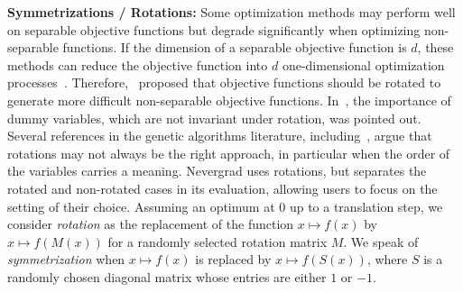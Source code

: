 {\textbf{Symmetrizations / Rotations:}} Some optimization methods may perform well on separable objective functions but degrade significantly when optimizing non-separable functions. If the dimension of a separable objective function is $d$, these methods can reduce the objective function into $d$ one-dimensional optimization processes~\cite{gaseparable}.  Therefore,~\cite{bbob,rotinv1} proposed that objective functions should be rotated {to generate more difficult non-separable objective functions}. In~\cite{bousquet}, the importance of dummy variables, which are not invariant under rotation, was pointed out. Several references in the genetic algorithms literature, including~\cite{holland}, argue that rotations may not always be the right approach, in particular when the order of the variables carries a meaning. 
Nevergrad uses rotations, but separates the rotated and non-rotated cases in its evaluation, allowing users to focus on the setting of their choice. Assuming an optimum at $0$ up to a translation step, we consider \emph{rotation} as the replacement of the function $x\mapsto f(x)$ by $x\mapsto f(M(x))$ for a randomly selected rotation matrix $M$. We speak of \emph{symmetrization} when $x \mapsto f(x)$ is replaced by $x\mapsto f(S(x))$, where $S$ is a randomly chosen diagonal matrix whose entries are either $1$ or $-1$. 

